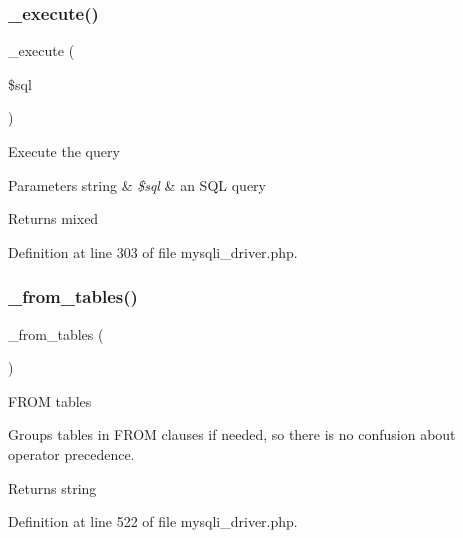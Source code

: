 \subsubsection{\texorpdfstring{\_execute()}{\_execute()}}
{\footnotesize\ttfamily \+\_\+execute (\begin{DoxyParamCaption}\item[{}]{\$sql }\end{DoxyParamCaption})\hspace{0.3cm}{\ttfamily [protected]}}

Execute the query


\begin{DoxyParams}[1]{Parameters}
string & {\em \$sql} & an S\+QL query \\
\hline
\end{DoxyParams}
\begin{DoxyReturn}{Returns}
mixed 
\end{DoxyReturn}


Definition at line 303 of file mysqli\+\_\+driver.\+php.

\mbox{\label{class_c_i___d_b__mysqli__driver_aef43f7e3e7b71d337ff3724c5eb14f10}} 
\subsubsection{\texorpdfstring{\_from\_tables()}{\_from\_tables()}}
{\footnotesize\ttfamily \+\_\+from\+\_\+tables (\begin{DoxyParamCaption}{ }\end{DoxyParamCaption})\hspace{0.3cm}{\ttfamily [protected]}}

F\+R\+OM tables

Groups tables in F\+R\+OM clauses if needed, so there is no confusion about operator precedence.

\begin{DoxyReturn}{Returns}
string 
\end{DoxyReturn}


Definition at line 522 of file mysqli\+\_\+driver.\+php.

\mbox{\label{class_c_i___d_b__mysqli__driver_a7ccb7f9c301fe7f0a9db701254142b63}} 

